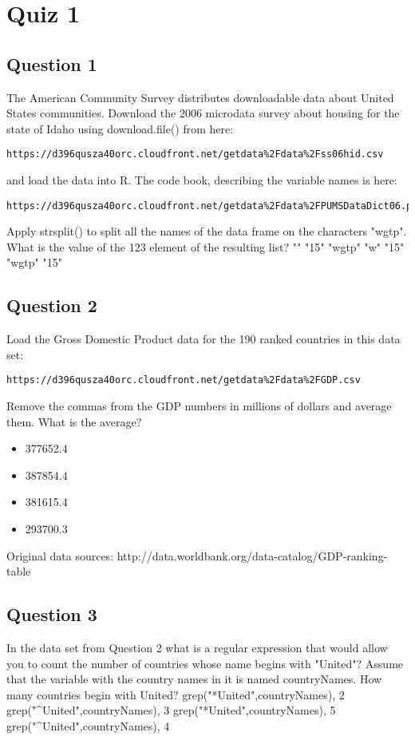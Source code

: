 \documentclass[]{article}
\begin{document}
\section{Quiz 1}

\subsection*{Question 1}
The American Community Survey distributes downloadable data about United States communities. Download the 2006 microdata survey about housing for the state of Idaho using download.file() from here: 

\begin{verbatim}
https://d396qusza40orc.cloudfront.net/getdata%2Fdata%2Fss06hid.csv 
\end{verbatim}
and load the data into R. The code book, describing the variable names is here: 
\begin{verbatim}
https://d396qusza40orc.cloudfront.net/getdata%2Fdata%2FPUMSDataDict06.pdf 
\end{verbatim}
Apply strsplit() to split all the names of the data frame on the characters "wgtp". What is the value of the 123 element of the resulting list?
"" "15"
"wgtp"
"w" "15"
"wgtp" "15"
\subsection*{Question 2}
Load the Gross Domestic Product data for the 190 ranked countries in this data set: 

\begin{verbatim}
https://d396qusza40orc.cloudfront.net/getdata%2Fdata%2FGDP.csv 
\end{verbatim}
Remove the commas from the GDP numbers in millions of dollars and average them. What is the average? 

\begin{itemize}
\item 377652.4
\item 387854.4
\item 381615.4
\item 293700.3
\end{itemize}

Original data sources: http://data.worldbank.org/data-catalog/GDP-ranking-table
\subsection*{Question 3}
In the data set from Question 2 what is a regular expression that would allow you to count the number of countries whose name begins with "United"? Assume that the variable with the country names in it is named countryNames. How many countries begin with United?
grep("*United",countryNames), 2
grep("^United",countryNames), 3
grep("*United",countryNames), 5
grep("^United",countryNames), 4
\end{document}
